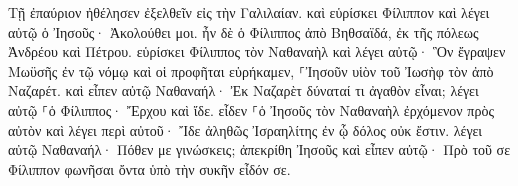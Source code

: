 \documentclass{openreader}
\begin{document}
Τῇ ἐπαύριον ἠθέλησεν ἐξελθεῖν εἰς τὴν Γαλιλαίαν. καὶ εὑρίσκει Φίλιππον καὶ λέγει αὐτῷ ὁ Ἰησοῦς· Ἀκολούθει μοι. 
ἦν δὲ ὁ Φίλιππος ἀπὸ Βηθσαϊδά, ἐκ τῆς πόλεως Ἀνδρέου καὶ Πέτρου. 
εὑρίσκει Φίλιππος τὸν Ναθαναὴλ καὶ λέγει αὐτῷ· Ὃν ἔγραψεν Μωϋσῆς ἐν τῷ νόμῳ καὶ οἱ προφῆται εὑρήκαμεν, ⸀Ἰησοῦν υἱὸν τοῦ Ἰωσὴφ τὸν ἀπὸ Ναζαρέτ. 
καὶ εἶπεν αὐτῷ Ναθαναήλ· Ἐκ Ναζαρὲτ δύναταί τι ἀγαθὸν εἶναι; λέγει αὐτῷ ⸀ὁ Φίλιππος· Ἔρχου καὶ ἴδε. 
εἶδεν ⸀ὁ Ἰησοῦς τὸν Ναθαναὴλ ἐρχόμενον πρὸς αὐτὸν καὶ λέγει περὶ αὐτοῦ· Ἴδε ἀληθῶς Ἰσραηλίτης ἐν ᾧ δόλος οὐκ ἔστιν. 
λέγει αὐτῷ Ναθαναήλ· Πόθεν με γινώσκεις; ἀπεκρίθη Ἰησοῦς καὶ εἶπεν αὐτῷ· Πρὸ τοῦ σε Φίλιππον φωνῆσαι ὄντα ὑπὸ τὴν συκῆν εἶδόν σε. 
\end{document}
